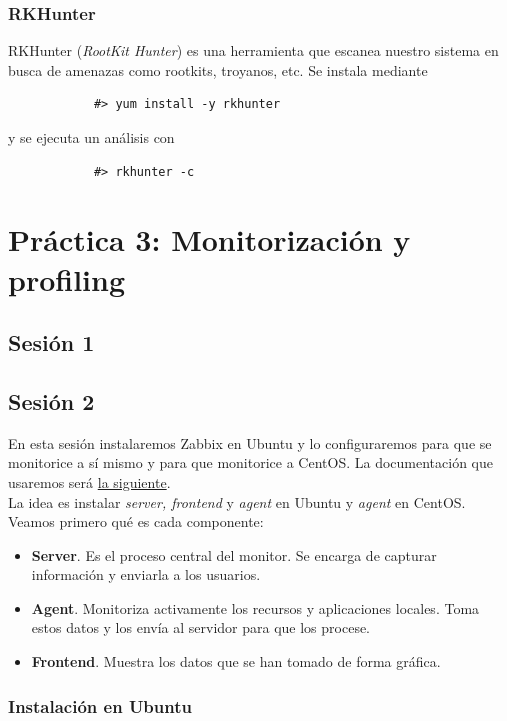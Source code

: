 \documentclass[12pt,spanish]{article}
\begin{document}
  \subsubsection{RKHunter}

  RKHunter (\textit{RootKit Hunter}) es una herramienta que escanea nuestro sistema en busca de amenazas como rootkits, troyanos, etc. Se instala mediante
  \begin{lstlisting}
            #> yum install -y rkhunter
  \end{lstlisting}
y se ejecuta un análisis con
\begin{lstlisting}
            #> rkhunter -c
\end{lstlisting}



\section{Práctica 3: Monitorización y profiling}

\subsection{Sesión 1}

\subsection{Sesión 2}
En esta sesión instalaremos Zabbix en Ubuntu y lo configuraremos para que se monitorice a sí mismo y para que monitorice a CentOS. La documentación que usaremos será \href{https://www.zabbix.com/documentation/3.4/manual}{la siguiente}.\\

La idea es instalar \textit{server, frontend} y \textit{agent} en Ubuntu y \textit{agent} en CentOS. Veamos primero qué es cada componente:

\begin{itemize}
  \item \textbf{Server}. Es el proceso central del monitor. Se encarga de capturar información y enviarla a los usuarios.
  \item \textbf{Agent}. Monitoriza activamente los recursos y aplicaciones locales. Toma estos datos y los envía al servidor para que los procese.
  \item \textbf{Frontend}. Muestra los datos que se han tomado de forma gráfica.
\end{itemize}

\subsubsection{Instalación en Ubuntu}
\end{document}
